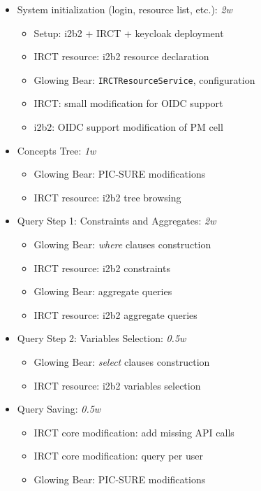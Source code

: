 \begin{itemize}
    \item System initialization (login, resource list, etc.): \emph{2w}
    \begin{itemize}
        \item Setup: i2b2 + IRCT + keycloak deployment
        \item IRCT resource: i2b2 resource declaration
        \item Glowing Bear: \verb|IRCTResourceService|, configuration
        \item IRCT: small modification for OIDC support
        \item i2b2: OIDC support modification of PM cell
    \end{itemize}
    
    \item Concepts Tree: \emph{1w}
    \begin{itemize}
        \item Glowing Bear: PIC-SURE modifications
        \item IRCT resource: i2b2 tree browsing
    \end{itemize}
    
    \item Query Step 1: Constraints and Aggregates: \emph{2w}
    \begin{itemize}
        \item Glowing Bear: \emph{where} clauses construction
        \item IRCT resource: i2b2 constraints
        \item Glowing Bear: aggregate queries
        \item IRCT resource: i2b2 aggregate queries
    \end{itemize}
    
    \item Query Step 2: Variables Selection: \emph{0.5w}
    \begin{itemize}
        \item Glowing Bear: \emph{select} clauses construction
        \item IRCT resource: i2b2 variables selection
    \end{itemize}
    
    \item Query Saving: \emph{0.5w}
    \begin{itemize}
        \item IRCT core modification: add missing API calls
        \item IRCT core modification: query per user
        \item Glowing Bear: PIC-SURE modifications
    \end{itemize}
    

\end{itemize}
